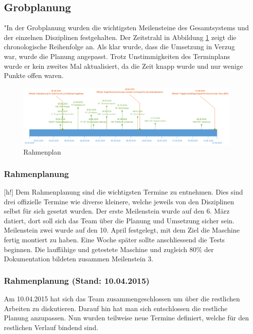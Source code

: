 \subsection{Grobplanung}"In der Grobplanung wurden die wichtigsten Meilensteine des Gesamtsystems und der einzelnen Disziplinen festgehalten.
Der Zeitstrahl in Abbildung \ref{fig:rahmenplanung} zeigt die chronologische Reihenfolge an. Als klar wurde, dass die Umsetzung in Verzug war, wurde die Planung angepasst.
Trotz Unstimmigkeiten des Terminplans wurde er kein zweites Mal aktualisiert, da die Zeit knapp wurde und nur wenige Punkte offen waren.


\begin{figure}
	\centering
	\includegraphics[width=1\linewidth]{../../fig/rahmenplanung}
	\caption{Rahmenplan}
	\label{fig:rahmenplanung}
\end{figure}
\subsubsection{Rahmenplanung}[h!]
Dem Rahmenplanung sind die wichtigsten Termine zu entnehmen. Dies sind drei offizielle Termine wie diverse kleinere, welche jeweils von den Disziplinen selbst für sich gesetzt wurden. Der erste Meilenstein wurde auf den 6. März datiert, dort soll sich das Team über die Planung und Umsetzung sicher sein.
Meilenstein zwei wurde auf den 10. April festgelegt, mit dem Ziel die Maschine fertig montiert zu haben. Eine Woche später sollte anschliessend die Tests beginnen. Die lauffähige und getestete Maschine und zugleich 80\% der Dokumentation bildeten zusammen Meilenstein 3.


\subsubsection{Rahmenplanung (Stand: 10.04.2015)}

Am 10.04.2015 hat sich das Team zusammengeschlossen um über die restlichen Arbeiten zu diskutieren. Darauf hin hat man sich entschlossen die restliche Planung anzupassen. Nun wurden teilweise neue Termine definiert, welche für den restlichen Verlauf bindend sind.

